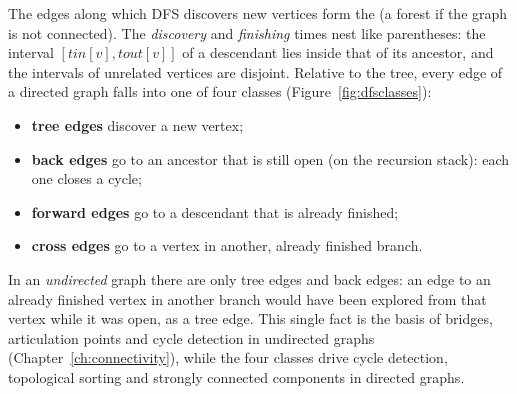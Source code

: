 The edges along which DFS discovers new vertices form the  (a forest if the graph is not connected). The
\emph{discovery} and \emph{finishing} times nest like parentheses: the interval $[\mathit{tin}[v], \mathit{tout}[v]]$ of a
descendant lies inside that of its ancestor, and the intervals of unrelated vertices are disjoint. Relative to the tree, every
edge of a directed graph falls into one of four classes (Figure~\ref{fig:dfsclasses}):
\begin{itemize}
  \item \textbf{tree edges} discover a new vertex;
  \item \textbf{back edges} go to an ancestor that is still open (on the recursion stack): each one closes a cycle;
  \item \textbf{forward edges} go to a descendant that is already finished;
  \item \textbf{cross edges} go to a vertex in another, already finished branch.
\end{itemize}
In an \emph{undirected} graph there are only tree edges and back edges: an edge to an already finished vertex in another
branch would have been explored from that vertex while it was open, as a tree edge. This single fact is the basis of bridges,
articulation points and cycle detection in undirected graphs (Chapter~\ref{ch:connectivity}), while the four classes drive
cycle detection, topological sorting and strongly connected components in directed graphs.

